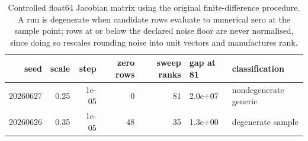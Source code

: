 \begin{table}[t]
\centering
\small
\begin{tabular}{rrrrrll}
\toprule
seed & scale & step & zero rows & sweep ranks & gap at 81 & classification \\
\midrule
20260627 & 0.25 & 1e-05 & 0 & 81 & 2.0e+07 & nondegenerate generic \\
20260626 & 0.35 & 1e-05 & 48 & 35 & 1.3e+00 & degenerate sample \\
\bottomrule
\end{tabular}
\caption{Controlled float64 Jacobian matrix using the original finite-difference procedure. A run is degenerate when candidate rows evaluate to numerical zero at the sample point; rows at or below the declared noise floor are never normalised, since doing so rescales rounding noise into unit vectors and manufactures rank.}
\label{tab:jacruns}
\end{table}
